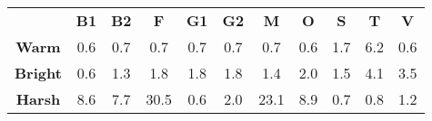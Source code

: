 \begin{tabular}{|c||c|c|c|c|c|c|c|c|c|c|}
	\cline{2-11}
	\multicolumn{1}{c|}{} & \bf{B1} & \bf{B2} & \bf{F} & \bf{G1} & \bf{G2} & \bf{M} & \bf{O} & \bf{S} & \bf{T} & \bf{V} \tabularnewline
	\hhline{-::=:=:=:=:=:=:=:=:=:=:}
	\bf{Warm} & 0.6 & 0.7 & 0.7 & 0.7 & 0.7 & 0.7 & 0.6 & 1.7 & 6.2 & 0.6 \tabularnewline
	\hline
	\bf{Bright} & 0.6 & 1.3 & 1.8 & 1.8 & 1.8 & 1.4 & 2.0 & 1.5 & 4.1 & 3.5 \tabularnewline
	\hline
	\bf{Harsh} &  8.6 &  7.7 & 30.5 &  0.6 &  2.0 & 23.1 &  8.9 &  0.7 &  0.8 &  1.2 \tabularnewline
	\hline
\end{tabular}
